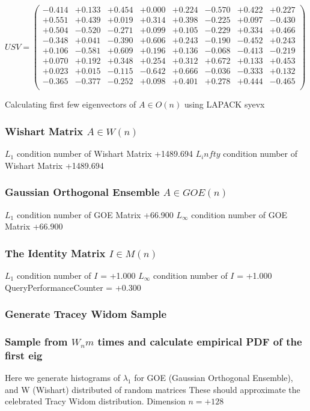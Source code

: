 \documentclass[9pt]{article}
\theoremstyle{plain}
\theoremstyle{definition}
\theoremstyle{remark}
\numberwithin{equation}{section}
\begin{document}
$U S V = \left(
\begin{array}{
cccccccc}
-0.414 & +0.133 & +0.454 & +0.000 & +0.224 & -0.570 & +0.422 & +0.227 \\
+0.551 & +0.439 & +0.019 & +0.314 & +0.398 & -0.225 & +0.097 & -0.430 \\
+0.504 & -0.520 & -0.271 & +0.099 & +0.105 & -0.229 & +0.334 & +0.466 \\
-0.348 & +0.041 & -0.390 & +0.606 & +0.243 & -0.190 & -0.452 & +0.243 \\
+0.106 & -0.581 & +0.609 & +0.196 & +0.136 & -0.068 & -0.413 & -0.219 \\
+0.070 & +0.192 & +0.348 & +0.254 & +0.312 & +0.672 & +0.133 & +0.453 \\
+0.023 & +0.015 & -0.115 & -0.642 & +0.666 & -0.036 & -0.333 & +0.132 \\
-0.365 & -0.377 & -0.252 & +0.098 & +0.401 & +0.278 & +0.444 & -0.465 \\
\end{array}
\right)$ \newline 

Calculating first few eigenvectors of $A \in O(n)$ using LAPACK syevx

\subsubsection{Wishart Matrix $A \in W(n)$}
$L_1$ condition number of Wishart Matrix +1489.694
$L_infty$ condition number of Wishart Matrix +1489.694
\subsubsection{Gaussian Orthogonal Ensemble $A \in GOE(n)$}
$L_1$ condition number of GOE Matrix +66.900
$L_\infty$ condition number of GOE Matrix +66.900
\subsubsection{The Identity Matrix $I \in M(n)$}
$L_1$ condition number of $I$ = +1.000
$L_\infty$ condition number of $I$ = +1.000
QueryPerformanceCounter  =  +0.300
\subsubsection{Generate Tracey Widom Sample}
\subsubsection{Sample from $W_n m$ times and calculate empirical PDF of the first eig}
Here we generate histograms of $\lambda_1$ for GOE (Gaussian Orthogonal Ensemble), and W (Wishart) 		 distributed of random matrices
These should approximate the celebrated Tracy Widom distribution.
Dimension $n = +128$
\end{document}
